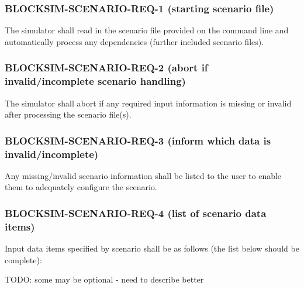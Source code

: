\documentclass{scrreprt}
\begin{document}
\subsubsection{BLOCKSIM-SCENARIO-REQ-1 (starting scenario file)}

The simulator shall read in the scenario file provided on the command line and
automatically process any dependencies (further included scenario files).


\subsubsection{BLOCKSIM-SCENARIO-REQ-2 (abort if invalid/incomplete scenario handling)}

The simulator shall abort if any required input information is missing or
invalid after processing the scenario file(s).

\subsubsection{BLOCKSIM-SCENARIO-REQ-3 (inform which data is invalid/incomplete)}
Any missing/invalid scenario information shall be listed to the user to enable
them to adequately configure the scenario.


\subsubsection{BLOCKSIM-SCENARIO-REQ-4 (list of scenario data items)}
Input data items specified by scenario shall be as follows
(the list below should be complete):

TODO: some may be optional - need to describe better
\end{document}

